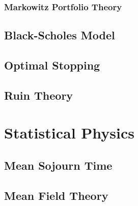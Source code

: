 \documentclass[11pt]{report} %
\begin{document}
\subsection{Markowitz Portfolio Theory}

\section{Black-Scholes Model}

\section{Optimal Stopping}

\section{Ruin Theory}

\chapter{Statistical Physics}

\section{Mean Sojourn Time}

\section{Mean Field Theory}

{}

\end{document}
